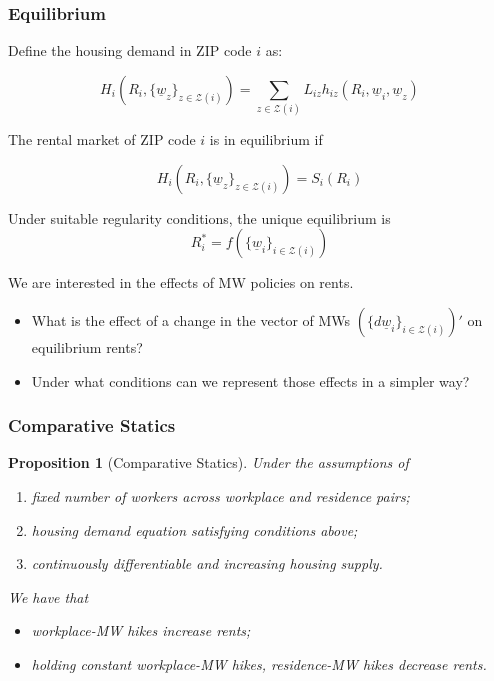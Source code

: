 \documentclass[aspectratio=169, t]{beamer}
\newtheorem{prop}{Proposition}
\newcommand{\Z}{\mathcal{Z}}
\newcommand{\MW}{\underline{w}}
\begin{document}
\begin{frame}
	\frametitle{Equilibrium}
	
	Define the housing demand in ZIP code $i$ as:
	
	 \[
	 H_{i} (R_i, \{\MW_z\}_{z\in\Z(i)}) = \sum_{z\in\Z(i)} L_{iz} h_{iz} (R_i, \MW_i, \MW_z)
	 \]
	
	The rental market of ZIP code $i$ is in equilibrium if
	
	$$ H_{i} (R_i, \{\MW_z\}_{z\in\Z(i)}) = S_i(R_i) $$
	
    Under suitable regularity conditions, the unique equilibrium is 
	$$R^*_i = f(\{\MW_i\}_{i\in\Z(i)})$$
	
	\vspace{3mm}
	\pause
	We are interested in the effects of MW policies on rents.
	\vspace{1mm}
	\begin{itemize} \small
		\item What is the effect of a change in the vector of MWs 
		$(\{d \MW_i\}_{i\in\Z(i)})'$ on equilibrium rents?
		\item Under what conditions can we represent those effects in a simpler way?
	\end{itemize}
\end{frame}

\begin{frame}[label = prop_comp_stat]
    \frametitle{Comparative Statics}
    
    \begin{prop}[Comparative Statics]\label{prop:comparative_statics}
        Under the assumptions of
        \begin{enumerate}
           \item fixed number of workers across workplace and residence pairs;
           \item housing demand equation satisfying conditions above; 
           \item continuously differentiable and increasing housing supply.
        \end{enumerate} 
        We have that
        \begin{itemize}
            \item workplace-MW hikes increase rents;
            \item holding constant workplace-MW hikes, residence-MW hikes decrease rents.
        \end{itemize}
    \end{prop}
\end{frame}
\end{document}
